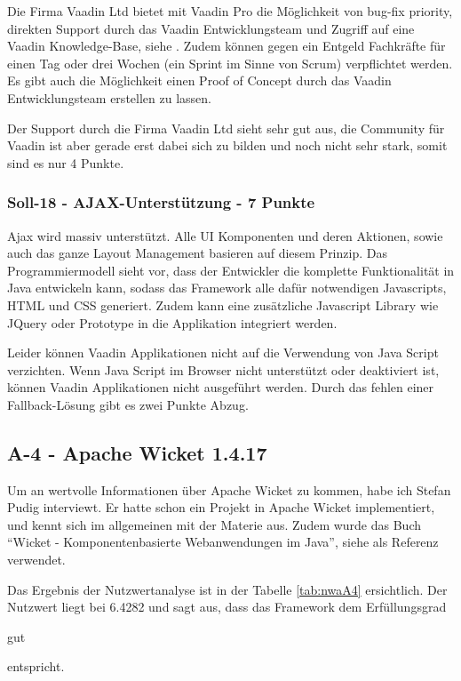   Die Firma Vaadin Ltd bietet mit Vaadin Pro die Möglichkeit von bug-fix
  priority, direkten Support durch das Vaadin Entwicklungsteam und Zugriff auf
  eine Vaadin Knowledge-Base, siehe \cite{VaadinPro}. Zudem können gegen ein
  Entgeld Fachkräfte für einen Tag oder drei Wochen (ein Sprint im Sinne von
  Scrum) verpflichtet werden. Es gibt auch die Möglichkeit einen Proof of
  Concept durch das Vaadin Entwicklungsteam erstellen zu lassen.
  
  Der Support durch die Firma Vaadin Ltd sieht sehr gut aus, die Community für
  Vaadin ist aber gerade erst dabei sich zu bilden und noch nicht sehr stark, somit
  sind es nur 4 Punkte.

  \subsubsection{Soll-18 - AJAX-Unterstützung - 7 Punkte}
  
  \ac{Ajax} wird massiv unterstützt. Alle \ac{UI} Komponenten und deren
  Aktionen, sowie auch das ganze Layout Management basieren auf diesem Prinzip.
  Das Programmiermodell sieht vor, dass der Entwickler die komplette
  Funktionalität in Java entwickeln kann, sodass das Framework alle dafür
  notwendigen Javascripts, \ac{HTML} und \ac{CSS} generiert. Zudem kann
  eine zusätzliche Javascript Library wie JQuery oder Prototype in die
  Applikation integriert werden.
  
  Leider können Vaadin Applikationen nicht auf die Verwendung von Java
  Script verzichten. Wenn Java Script im Browser nicht unterstützt oder
  deaktiviert ist, können Vaadin Applikationen nicht ausgeführt werden. Durch
  das fehlen einer Fallback-Lösung gibt es zwei Punkte Abzug.
  
  \subsection{A-4 - Apache Wicket 1.4.17}
  
  Um an wertvolle Informationen über Apache Wicket zu kommen, habe ich Stefan
  Pudig interviewt. Er hatte schon ein Projekt in Apache Wicket implementiert,
  und kennt sich im allgemeinen mit der Materie aus. Zudem wurde das Buch
  ``Wicket - Komponentenbasierte Webanwendungen im Java'', siehe \cite{Wicket} als
  Referenz verwendet.
  
  Das Ergebnis der Nutzwertanalyse ist in der Tabelle \ref{tab:nwaA4}
  ersichtlich. Der Nutzwert liegt bei 6.4282 und sagt aus, dass das Framework
  dem Erfüllungsgrad \begin{itshape}gut\end{itshape} entspricht.
  \newline
  
